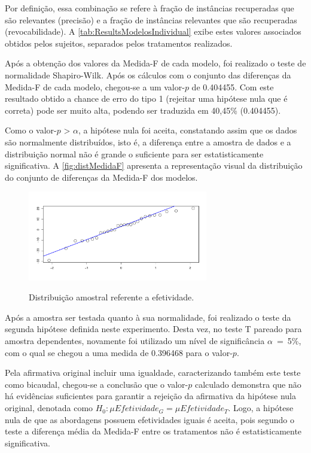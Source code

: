 Por definição, essa combinação se refere à fração de instâncias recuperadas que são relevantes (precisão) e a fração de instâncias relevantes que são recuperadas  (revocabilidade).
A \autoref{tab:ResultsModelosIndividual} exibe estes valores associados obtidos pelos sujeitos, separados pelos tratamentos realizados.

Após a obtenção dos valores da Medida-F de cada modelo, foi realizado o teste de normalidade Shapiro-Wilk.
Após os cálculos com o conjunto das diferenças da Medida-F de cada modelo, chegou-se a um valor-$p$ de 0.404455.
Com este resultado obtido a chance de erro do tipo 1 (rejeitar uma hipótese nula que é correta) pode ser muito alta, podendo ser traduzida em 40,45\% (0.404455).

Como o valor-$p$ > $\alpha$, a hipótese nula foi aceita, constatando assim que os dados são normalmente distribuídos, isto é, a diferença entre a amostra de dados e a distribuição normal não é grande o suficiente para ser estatisticamente significativa.
A \autoref{fig:distMedidaF} apresenta a representação visual da distribuição do conjunto de diferenças da Medida-F dos modelos.

\begin{figure}[!htb]
    \centering
    \caption{Distribuição amostral referente a efetividade.}
    \includegraphics[width=0.7\textwidth]{ResultsExp/DistribuicaoAmostraFScore}
    \label{fig:distMedidaF}
\end{figure}

Após a amostra ser testada quanto à sua normalidade, foi realizado o teste da segunda hipótese definida neste experimento. 
Desta vez, no teste T pareado para amostra dependentes, novamente foi utilizado um nível de significância $\alpha$~=~5\%, com o qual se chegou a uma medida de 0.396468 para o valor-$p$. 

Pela afirmativa original incluir uma igualdade, caracterizando também este teste como bicaudal, chegou-se a conclusão que o valor-$p$ calculado demonstra que não há evidências suficientes para garantir a rejeição da afirmativa da hipótese nula original, denotada como $H_0 : \mu Efetividade_G = \mu Efetividade_T$.
Logo, a hipótese nula de que as abordagens possuem efetividades iguais é aceita, pois segundo o teste a diferença média da Medida-F entre os tratamentos não é estatisticamente significativa.


